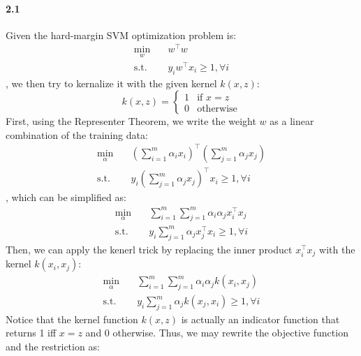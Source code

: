 \documentclass[11pt]{article}
\begin{document}
\paragraph{2.1}
Given the hard-margin SVM optimization problem is:
\begin{equation}
    \begin{split}
        \min_{w} \quad &w^\top w \\
        \text{s.t.} \quad &y_iw^\top x_i \geq 1, \forall i
    \end{split}
\end{equation}
, we then try to kernalize it with the given kernel $k(x,z)$:
\begin{equation}
    k(x,z) = \begin{cases}
        1 & \text{if } x = z \\
        0 & \text{otherwise}
    \end{cases}
\end{equation}
First, using the Representer Theorem, we write the weight $w$ as a linear combination of the training data:
\begin{equation}
    \begin{split}
        \min_{\alpha} \quad &(\sum_{i=1}^m \alpha_i x_i)^\top (\sum_{j=1}^m \alpha_j x_j) \\ 
        \text{s.t.} \quad &y_i (\sum_{j=1}^m \alpha_j x_j)^\top x_i \geq 1, \forall i
    \end{split}
\end{equation}
, which can be simplified as:
\begin{equation}
    \begin{split}
        \min_{\alpha} \quad &\sum_{i=1}^m \sum_{j=1}^m \alpha_i \alpha_j x_i^\top x_j \\
        \text{s.t.} \quad &y_i \sum_{j=1}^m \alpha_j x_j^\top x_i \geq 1, \forall i
    \end{split}
\end{equation}
Then, we can apply the kenerl trick by replacing the inner product $x_i^\top x_j$ with the kernel $k(x_i, x_j)$:
\begin{equation}
    \begin{split}
        \min_{\alpha} \quad &\sum_{i=1}^m \sum_{j=1}^m \alpha_i \alpha_j k(x_i, x_j) \\
        \text{s.t.} \quad &y_i \sum_{j=1}^m \alpha_j k(x_j, x_i) \geq 1, \forall i
    \end{split}
\end{equation}
Notice that the kernel function $k(x,z)$ is actually an indicator function that returns 1 iff $x=z$ and 0 otherwise. Thus, we may rewrite the objective function and the restriction as:
\end{document}

